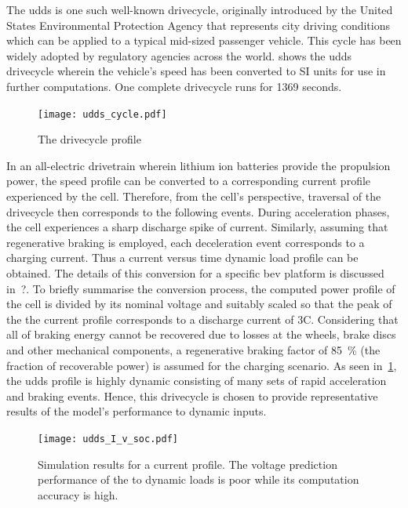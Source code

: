 The \gls{udds} is  one such well-known drivecycle, originally  introduced by the
United  States  Environmental Protection  Agency  that  represents city  driving
conditions which can  be applied to a typical mid-sized  passenger vehicle. This
cycle  has  been  widely  adopted  by  regulatory  agencies  across  the  world.
  shows  the  \gls{udds} drivecycle  wherein  the
vehicle's speed has been converted to  SI units for use in further computations.
One complete drivecycle runs for 1369 seconds.

\begin{figure}[!htb]
    \centering
    \texttt{[image: udds\_cycle.pdf]}
    \caption{The  drivecycle profile}
    \label{fig:uddsspeedvstimecycle}
\end{figure}

In  an  all-electric  drivetrain  wherein  lithium  ion  batteries  provide  the
propulsion power, the speed profile can  be converted to a corresponding current
profile  experienced  by  the  cell. Therefore,  from  the  cell's  perspective,
traversal of  the drivecycle  then corresponds to  the following  events. During
acceleration phases,  the cell experiences  a sharp discharge spike  of current.
Similarly,  assuming that  regenerative braking  is employed,  each deceleration
event corresponds to a charging current. Thus a current versus time dynamic load
profile can be obtained. The details of this conversion for a specific \gls{bev}
platform is  discussed in~?. To
briefly summarise the conversion process, the computed power profile of the cell
is divided by  its nominal voltage and  suitably scaled so that the  peak of the
the current profile  corresponds to a discharge current of  3C. Considering that
all of  braking energy cannot  be recovered due to  losses at the  wheels, brake
discs  and  other  mechanical  components,  a  regenerative  braking  factor  of
\SI{85}{\percent}  (the  fraction  of  recoverable power)  is  assumed  for  the
charging  scenario. As  seen in~\cref{fig:uddsspeedvstimecycle},  the \gls{udds}
profile is  highly dynamic  consisting of  many sets  of rapid  acceleration and
braking  events. Hence,  this  drivecycle is  chosen  to provide  representative
results of the model's performance to dynamic inputs.

\begin{figure}[!htb]
    \centering
    \texttt{[image: udds\_I\_v\_soc.pdf]} %
    \caption[Simulation results of  and 
    models to  current profile]{Simulation results for a
         current profile. The voltage prediction performance
        of the  to dynamic loads is poor while its
     computation accuracy is high.}
    \label{fig:uddssimp2dspmresults}
\end{figure}

